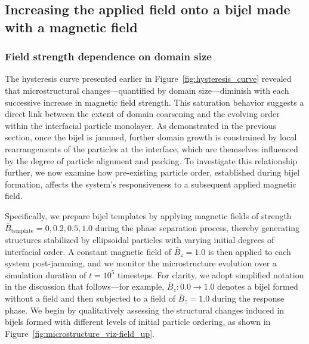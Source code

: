 \subsection{Increasing the applied field onto a bijel made with a magnetic field}
\subsubsection{Field strength dependence on domain size}
\label{section:increasing-the-applied-field}


The hysteresis curve presented earlier in Figure~\ref{fig:hysteresis_curve} revealed that microstructural changes—quantified by domain size—diminish 
with each successive increase in magnetic field strength. This saturation behavior suggests a direct link between the extent of domain coarsening 
and the evolving order within the interfacial particle monolayer. As demonstrated in the previous section, once the bijel is jammed, further domain 
growth is constrained by local rearrangements of the particles at the interface, which are themselves influenced by the degree of particle alignment 
and packing. To investigate this relationship further, we now examine how pre-existing particle order, established during bijel formation, affects 
the system's responsiveness to a subsequent applied magnetic field.

Specifically, we prepare bijel templates by applying magnetic fields of strength \(\bar{B}_{\text{template}} = 0, 0.2, 0.5, 1.0\) during the phase separation 
process, thereby generating structures stabilized by ellipsoidal particles with varying initial degrees of interfacial order. A constant magnetic field of 
\(\bar{B}_z = 1.0\) is then applied to each system post-jamming, and we monitor the microstructure evolution over a simulation duration of \(t = 10^5\) 
timesteps. For clarity, we adopt simplified notation in the discussion that follows—for example, \(\bar{B}_z: 0.0 \rightarrow 1.0\) denotes a bijel 
formed without a field and then subjected to a field of \(\bar{B}_z = 1.0\) during the response phase. We begin by qualitatively assessing the 
structural changes induced in bijels formed with different levels of initial particle ordering, as shown in Figure~\ref{fig:microstructure_viz-field_up}.


